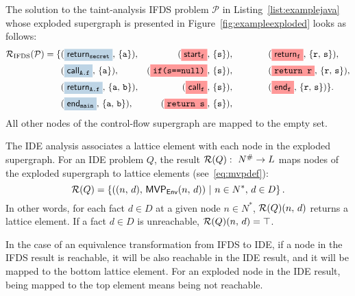 \begin{mdelete}
\begin{example}\label{ex:ifdsresult}
  The solution to the taint-analysis IFDS problem $\mathcal P$ in Listing~\ref{list:examplejava} whose exploded supergraph is presented in Figure~\ref{fig:exampleexploded} looks as follows:
  \small\begin{align*}
    \result_\text{IFDS}(\mathcal P)=\{&(\highlight{\textsf{return}_\texttt{secret}}{greyblue},\,\{\texttt a\}),
      &(\highlight{\textsf{start}_\texttt f}{lightsalmonpink},\,\{\texttt s\}),
      &\qquad\qquad(\highlight{\textsf{return}_\texttt f}{lightsalmonpink},\,\{\texttt r,\,\texttt s\}),\\
%      
      &(\highlight{\textsf{call}_\texttt{A.f}}{greyblue},\,\{\texttt a\}),
      &(\highlight{\texttt{if(s==null)}}{lightsalmonpink},\,\{\texttt s\}),
      &\qquad\qquad(\highlight{\texttt{return r}}{lightsalmonpink},\,\{\texttt r,\,\texttt s\}),\\
%
      &(\highlight{\textsf{return}_\texttt{A.f}}{greyblue},\,\{\texttt a,\,\texttt b\}),
      &(\highlight{\textsf{call}_\texttt f}{lightsalmonpink},\,\{\texttt s\}),
      &\qquad\qquad(\highlight{\textsf{end}_\texttt f}{lightsalmonpink},\,\{\texttt r,\,\texttt s\})\}.\\
%
      &(\highlight{\textsf{end}_\texttt{main}}{greyblue},\,\{\texttt a,\,\texttt b\}),&(\highlight{\texttt{return s}}{lightsalmonpink},\,\{\texttt s\}),
  \end{align*}\normalsize
  All other nodes of the control-flow supergraph are mapped to the empty set.
\end{example}
\end{mdelete}

 The IDE analysis associates a lattice element with each node in the exploded supergraph. For an IDE problem $Q$, the result $\mathcal R(Q):\ N^\#\to L$ maps nodes of the exploded supergraph to lattice elements (see~\eqref{eq:mvpdef}):
\begin{equation}\label{eq:ideresult}
  \mathcal R(Q)=\{((n,\,d),\,\textsf{MVP}_{\textsf{Env}}(n,\,d))\ |\ n\in N^*,\,d\in D\}\,.
\end{equation}
In other words, for each fact $d\in D$ at a given node $n\in N^*$, $\mathcal R(Q)(n,\,d)$ returns a lattice element. If a fact $d\in D$ is unreachable, $\mathcal R(Q)(n,\,d)=\top$.

In the case of an equivalence transformation from IFDS to IDE, if a node in the IFDS result is reachable, it will be also reachable in the IDE result, and it will be mapped to the bottom lattice element. For an exploded node in the IDE result, being mapped to the top element means being not reachable.

